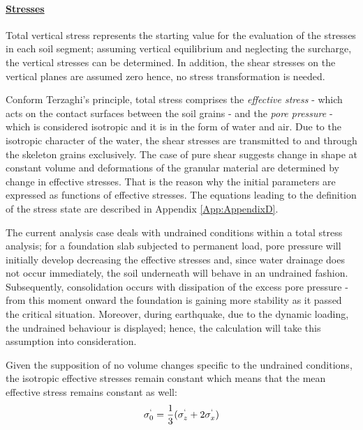 \documentclass[10pt,a4paper]{report}
\begin{document}
\paragraph{\underline{Stresses}}
Total vertical stress represents the starting value for the evaluation of the stresses in each soil segment; assuming vertical equilibrium and neglecting the surcharge, the vertical stresses can be determined. In addition, the shear stresses on the vertical planes are assumed zero hence, no stress transformation is needed.

Conform Terzaghi's principle, total stress comprises the \textit{effective stress} - which acts on the contact surfaces between the soil grains - and the \textit{pore pressure} - which is considered isotropic and it is in the form of water and air. Due to the isotropic character of the water, the shear stresses are transmitted to and through the skeleton grains exclusively. The case of pure shear suggests change in shape at constant volume and deformations of the granular material are determined by change in effective stresses. That is the reason why the initial parameters are expressed as functions of effective stresses. The equations leading to the definition of the stress state are described in Appendix \ref{App:AppendixD}.

The current analysis case deals with undrained conditions within a total stress analysis; for a foundation slab subjected to permanent load, pore pressure will initially develop decreasing the effective stresses and, since water drainage does not occur immediately, the soil underneath will behave in an undrained fashion.  Subsequently, consolidation occurs with dissipation of the excess pore pressure - from this moment onward the foundation is gaining more stability as it passed the critical situation. Moreover, during earthquake, due to the dynamic loading, the undrained behaviour is displayed; hence, the calculation will take this assumption into consideration. 

Given the supposition of no volume changes specific to the undrained conditions, the isotropic effective stresses remain constant which means that the mean effective stress remains constant as well:
\begin{equation}
	\sigma^`_0=\frac{1}{3}(\sigma^`_z+2\sigma^`_x)
\end{equation}
\end{document}
